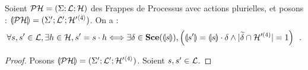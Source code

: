 \begin{theorem}[$\PH \approx \phmtophp$]
  Soient $\mathcal{PH} = (\Sigma; \mathcal{L}; \mathcal{H})$ des Frappes de Processus avec actions plurielles,
  et posons : $\llparenthesis \mathcal{PH} \rrparenthesis = (\Sigma'; \mathcal{L}'; \mathcal{H}'^{\langle 4 \rangle})$.
  On a :
% 
  \[\forall s, s' \in \mathcal{L}, \exists h \in \mathcal{H}, s' = s \cdot h \Longleftrightarrow
    \exists \delta \in \mathbf{Sce}(\llparenthesis s \rrparenthesis), \left( \llparenthesis s' \rrparenthesis = \llparenthesis s \rrparenthesis \cdot \delta
    \wedge |\widetilde{\delta} \cap \mathcal{H}'^{(4)}| = 1 \right) \enspace.\]
\end{theorem}

\begin{proof}
  Posons $\llparenthesis \mathcal{PH} \rrparenthesis = (\Sigma'; \mathcal{L}'; \mathcal{H}'^{\langle 4 \rangle})$.
  Soient $s, s' \in \mathcal{L}$.
  

\end{proof}
